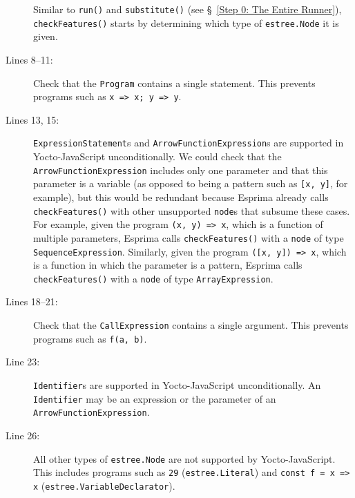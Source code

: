 \documentclass[12pt, oneside]{book}
\begin{document}
\begin{description}
Similar to \texttt{run()} and \texttt{substitute()} (see §~\ref{Step 0: The Entire Runner}), \texttt{checkFeatures()} starts by determining which type of \texttt{estree.Node} it is given.

\item [Lines 8–11:]

Check that the \texttt{Program} contains a single statement. This prevents programs such as \texttt{x => x; y => y}.

\item [Lines 13, 15:]

\texttt{ExpressionStatement}s and \texttt{ArrowFunctionExpression}s are supported in Yocto-JavaScript unconditionally. We could check that the \texttt{ArrowFunctionExpression} includes only one parameter and that this parameter is a variable (as opposed to being a pattern such as \texttt{[x, y]}, for example), but this would be redundant because Esprima already calls \texttt{checkFeatures()} with other unsupported \texttt{node}s that subsume these cases. For example, given the program \texttt{(x, y) => x}, which is a function of multiple parameters, Esprima calls \texttt{checkFeatures()} with a \texttt{node} of type \texttt{SequenceExpression}. Similarly, given the program \texttt{([x, y]) => x}, which is a function in which the parameter is a pattern, Esprima calls \texttt{checkFeatures()} with a \texttt{node} of type \texttt{ArrayExpression}.

\item [Lines 18–21:]

Check that the \texttt{CallExpression} contains a single argument. This prevents programs such as \texttt{f(a, b)}.

\item [Line 23:]

\texttt{Identifier}s are supported in Yocto-JavaScript unconditionally. An \texttt{Identifier} may be an expression or the parameter of an \texttt{ArrowFunctionExpression}.

\item [Line 26:]

All other types of \texttt{estree.Node} are not supported by Yocto-JavaScript. This includes programs such as \texttt{29} (\texttt{estree.Literal}) and \texttt{const f = x => x} (\texttt{estree.VariableDeclarator}).
\end{description}
\end{document}
